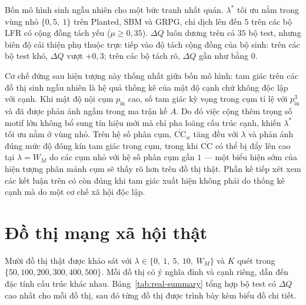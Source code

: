 Bốn mô hình sinh ngẫu nhiên cho một bức tranh nhất quán. $\lambda^*$ tối ưu nằm trong vùng nhỏ $\{0{,}5,\ 1\}$ trên Planted, SBM và GRPG, chỉ dịch lên đến $5$ trên các bộ LFR có cộng đồng tách yếu ($\mu \geq 0{,}35$). $\Delta Q$ luôn dương trên cả $35$ bộ test, nhưng biên độ cải thiện phụ thuộc trực tiếp vào độ tách cộng đồng của bộ sinh: trên các bộ test khó, $\Delta Q$ vượt $+0{,}3$; trên các bộ tách rõ, $\Delta Q$ gần như bằng $0$.

Cơ chế đứng sau hiện tượng này thống nhất giữa bốn mô hình: tam giác trên các đồ thị sinh ngẫu nhiên là hệ quả thống kê của mật độ cạnh chứ không độc lập với cạnh. Khi mật độ nội cụm $p_{\mathrm{in}}$ cao, số tam giác kỳ vọng trong cụm tỉ lệ với $p_{\mathrm{in}}^3$ và đã được phản ánh ngầm trong ma trận kề $A$. Do đó việc cộng thêm trọng số motif lớn không bổ sung tín hiệu mới mà chỉ pha loãng cấu trúc cạnh, khiến $\lambda^*$ tối ưu nằm ở vùng nhỏ. Trên hệ số phân cụm, $\overline{\mathrm{CC}}_w$ tăng đều với $\lambda$ và phản ánh đúng mức độ đóng kín tam giác trong cụm, trong khi $\overline{\mathrm{CC}}$ có thể bị đẩy lên cao tại $\lambda = W_M$ do các cụm nhỏ với hệ số phân cụm gần $1$ — một biểu hiện sớm của hiện tượng phân mảnh cụm sẽ thấy rõ hơn trên đồ thị thật. Phần kế tiếp xét xem các kết luận trên có còn đúng khi tam giác xuất hiện không phải do thống kê cạnh mà do một cơ chế xã hội độc lập.

\clearpage

\section{Đồ thị mạng xã hội thật}
\label{sec:results-real}

Mười đồ thị thật được khảo sát với $\lambda \in \{0,\ 1,\ 5,\ 10,\ W_M\}$ và $K$ quét trong $\{50, 100, 200, 300, 400, 500\}$. Mỗi đồ thị có ý nghĩa đỉnh và cạnh riêng, dẫn đến đặc tính cấu trúc khác nhau. Bảng~\ref{tab:real-summary} tổng hợp bộ test có $\Delta Q$ cao nhất cho mỗi đồ thị, sau đó từng đồ thị được trình bày kèm biểu đồ chi tiết.

